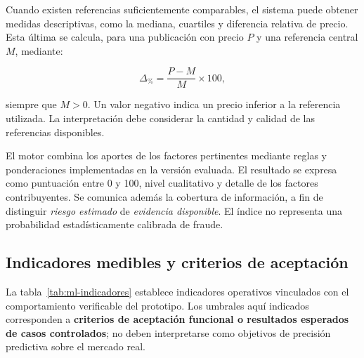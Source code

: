 Cuando existen referencias suficientemente comparables, el sistema puede obtener medidas descriptivas, como la mediana, cuartiles y diferencia relativa de precio. Esta última se calcula, para una publicación con precio $P$ y una referencia central $M$, mediante:

\begin{equation}
    \Delta_{\%} = \frac{P-M}{M}\times 100,
    \label{eq:ml-diferencia-precio}
\end{equation}

siempre que $M>0$. Un valor negativo indica un precio inferior a la referencia utilizada. La interpretación debe considerar la cantidad y calidad de las referencias disponibles.

El motor combina los aportes de los factores pertinentes mediante reglas y ponderaciones implementadas en la versión evaluada. El resultado se expresa como puntuación entre 0 y 100, nivel cualitativo y detalle de los factores contribuyentes. Se comunica además la cobertura de información, a fin de distinguir \textit{riesgo estimado} de \textit{evidencia disponible}. El índice no representa una probabilidad estadísticamente calibrada de fraude.

\subsection{Indicadores medibles y criterios de aceptación}\label{subsec:ml-indicadores}

La tabla~\ref{tab:ml-indicadores} establece indicadores operativos vinculados con el comportamiento verificable del prototipo. Los umbrales aquí indicados corresponden a \textbf{criterios de aceptación funcional o resultados esperados de casos controlados}; no deben interpretarse como objetivos de precisión predictiva sobre el mercado real.

